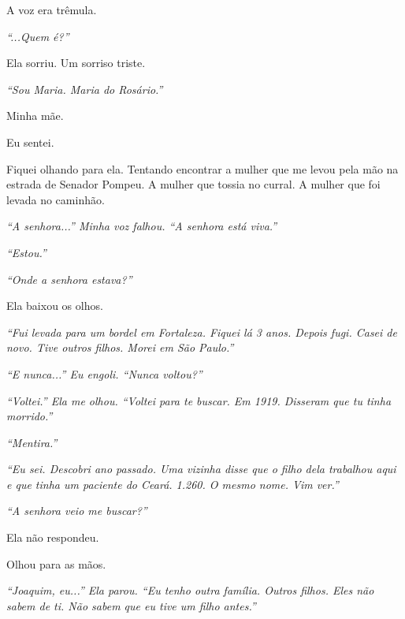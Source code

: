 \noindent A voz era trêmula.

\noindent \textit{\textquotedblleft{}...Quem é?\textquotedblright{}}

\noindent Ela sorriu. Um sorriso triste.

\noindent \textit{\textquotedblleft{}Sou Maria. Maria do Rosário.\textquotedblright{}}

\noindent Minha mãe.

\noindent Eu sentei.

\noindent Fiquei olhando para ela. Tentando encontrar a mulher que me levou pela mão na estrada de Senador Pompeu. A mulher que tossia no curral. A mulher que foi levada no caminhão.

\noindent \textit{\textquotedblleft{}A senhora...\textquotedblright{}\textit{ Minha voz falhou. }\textquotedblleft{}A senhora está viva.\textquotedblright{}}

\noindent \textit{\textquotedblleft{}Estou.\textquotedblright{}}

\noindent \textit{\textquotedblleft{}Onde a senhora estava?\textquotedblright{}}

\noindent Ela baixou os olhos.

\noindent \textit{\textquotedblleft{}Fui levada para um bordel em Fortaleza. Fiquei lá 3 anos. Depois fugi. Casei de novo. Tive outros filhos. Morei em São Paulo.\textquotedblright{}}

\noindent \textit{\textquotedblleft{}E nunca...\textquotedblright{}\textit{ Eu engoli. }\textquotedblleft{}Nunca voltou?\textquotedblright{}}

\noindent \textit{\textquotedblleft{}Voltei.\textquotedblright{}\textit{ Ela me olhou. }\textquotedblleft{}Voltei para te buscar. Em 1919. Disseram que tu tinha morrido.\textquotedblright{}}

\noindent \textit{\textquotedblleft{}Mentira.\textquotedblright{}}

\noindent \textit{\textquotedblleft{}Eu sei. Descobri ano passado. Uma vizinha disse que o filho dela trabalhou aqui e que tinha um paciente do Ceará. 1.260. O mesmo nome. Vim ver.\textquotedblright{}}

\noindent \textit{\textquotedblleft{}A senhora veio me buscar?\textquotedblright{}}

\noindent Ela não respondeu.

\noindent Olhou para as mãos.

\noindent \textit{\textquotedblleft{}Joaquim, eu...\textquotedblright{}\textit{ Ela parou. }\textquotedblleft{}Eu tenho outra família. Outros filhos. Eles não sabem de ti. Não sabem que eu tive um filho antes.\textquotedblright{}}


